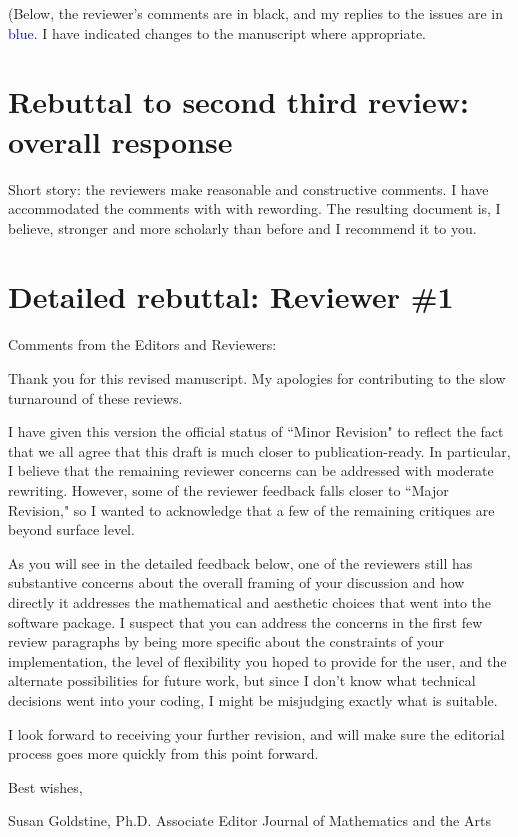 \documentclass[12pt]{article}
\begin{document}
(Below, the reviewer's comments are in black, and my replies to the
issues are in \textcolor{blue}{blue}.  I have indicated changes to the
manuscript where appropriate.

\section*{Rebuttal to second third review: overall response}

Short story: the reviewers make reasonable and constructive comments.
I have accommodated the comments with  with rewording.  The resulting
document is, I believe, stronger and more scholarly than before and I
recommend it to you.


\section*{Detailed rebuttal: Reviewer \#1}


Comments from the Editors and Reviewers:

Thank you for this revised manuscript.  My apologies for contributing
to the slow turnaround of these reviews.

I have given this version the official status of ``Minor Revision" to
reflect the fact that we all agree that this draft is much closer to
publication-ready. In particular, I believe that the remaining
reviewer concerns can be addressed with moderate rewriting.  However,
some of the reviewer feedback falls closer to ``Major Revision," so I
wanted to acknowledge that a few of the remaining critiques are beyond
surface level.

As you will see in the detailed feedback below, one of the reviewers
still has substantive concerns about the overall framing of your
discussion and how directly it addresses the mathematical and
aesthetic choices that went into the software package.  I suspect that
you can address the concerns in the first few review paragraphs by
being more specific about the constraints of your implementation, the
level of flexibility you hoped to provide for the user, and the
alternate possibilities for future work, but since I don't know what
technical decisions went into your coding, I might be misjudging
exactly what is suitable.

I look forward to receiving your further revision, and will make sure
the editorial process goes more quickly from this point forward.

Best wishes,

Susan Goldstine, Ph.D.
Associate Editor
Journal of Mathematics and the Arts
\end{document}
